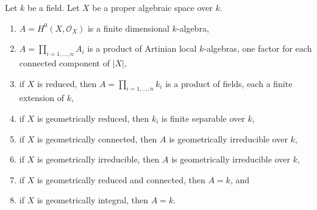 \begin{lemma}
\label{lemma-proper-geometrically-reduced-global-sections}
Let $k$ be a field. Let $X$ be a proper algebraic space over $k$.
\begin{enumerate}
\item $A = H^0(X, \mathcal{O}_X)$ is a finite dimensional $k$-algebra,
\item $A = \prod_{i = 1, \ldots, n} A_i$ is a product of Artinian
local $k$-algebras, one factor for each connected component of $|X|$,
\item if $X$ is reduced, then $A = \prod_{i = 1, \ldots, n} k_i$
is a product of fields, each a finite extension of $k$,
\item if $X$ is geometrically reduced, then $k_i$ is finite separable
over $k$,
\item if $X$ is geometrically connected, then $A$ is geometrically
irreducible over $k$,
\item if $X$ is geometrically irreducible, then $A$ is geometrically
irreducible over $k$,
\item if $X$ is geometrically reduced and connected, then $A = k$, and
\item if $X$ is geometrically integral, then $A = k$.
\end{enumerate}
\end{lemma}

